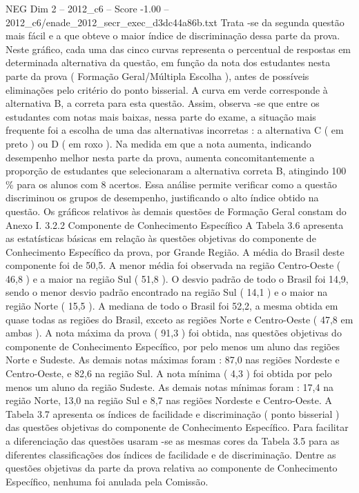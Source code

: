 \begin{textsample}{NEG Dim 2 – 2012\_c6 – Score -1.00 – 2012\_c6/enade\_2012\_secr\_exec\_d3dc44a86b.txt}
Trata -se da segunda questão mais fácil e a que obteve o maior índice de discriminação dessa parte da prova.
Neste gráfico, cada uma das cinco curvas representa o percentual de respostas em determinada alternativa da questão, em função da nota dos estudantes nesta parte da prova ( Formação Geral/Múltipla Escolha ), antes de possíveis eliminações pelo critério do ponto bisserial.
A curva em verde corresponde à alternativa B, a correta para esta questão.
Assim, observa -se que entre os estudantes com notas mais baixas, nessa parte do exame, a situação mais frequente foi a escolha de uma das alternativas incorretas : a alternativa C ( em preto ) ou D ( em roxo ).
Na medida em que a nota aumenta, indicando desempenho melhor nesta parte da prova, aumenta concomitantemente a proporção de estudantes que selecionaram a alternativa correta B, atingindo 100 \% para os alunos com 8 acertos.
Essa análise permite verificar como a questão discriminou os grupos de desempenho, justificando o alto índice obtido na questão.
Os gráficos relativos às demais questões de Formação Geral constam do Anexo I. 3.2.2 Componente de Conhecimento Específico A Tabela 3.6 apresenta as estatísticas básicas em relação às questões objetivas do componente de Conhecimento Específico da prova, por Grande Região.
A média do Brasil deste componente foi de 50,5.
A menor média foi observada na região Centro-Oeste ( 46,8 ) e a maior na região Sul ( 51,8 ).
O desvio padrão de todo o Brasil foi 14,9, sendo o menor desvio padrão encontrado na região Sul ( 14,1 ) e o maior na região Norte ( 15,5 ).
A mediana de todo o Brasil foi 52,2, a mesma obtida em quase todas as regiões do Brasil, exceto as regiões Norte e Centro-Oeste ( 47,8 em ambas ).
A nota máxima da prova ( 91,3 ) foi obtida, nas questões objetivas do componente de Conhecimento Específico, por pelo menos um aluno das regiões Norte e Sudeste.
As demais notas máximas foram : 87,0 nas regiões Nordeste e Centro-Oeste, e 82,6 na região Sul.
A nota mínima ( 4,3 ) foi obtida por pelo menos um aluno da região Sudeste.
As demais notas mínimas foram : 17,4 na região Norte, 13,0 na região Sul e 8,7 nas regiões Nordeste e Centro-Oeste.
A Tabela 3.7 apresenta os índices de facilidade e discriminação ( ponto bisserial ) das questões objetivas do componente de Conhecimento Específico.
Para facilitar a diferenciação das questões usaram -se as mesmas cores da Tabela 3.5 para as diferentes classificações dos índices de facilidade e de discriminação.
Dentre as questões objetivas da parte da prova relativa ao componente de Conhecimento Específico, nenhuma foi anulada pela Comissão.

\end{textsample}
